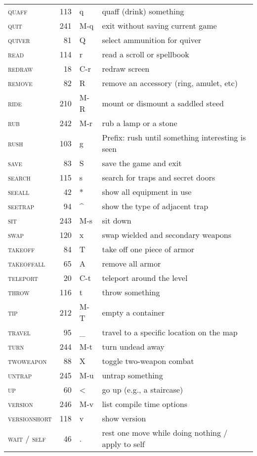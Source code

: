 \documentclass{article}
\begin{document}
\begin{center}
\begin{longtable}{>{\scshape}lr>{\ttfamily}ll}
    quaff & 113 & q  & quaff (drink) something\\
    quit & 241 & M-q  & exit without saving current game\\
    quiver & 81 & Q  & select ammunition for quiver\\
    read & 114 & r  & read a scroll or spellbook\\
    redraw & 18 & C-r  & redraw screen\\
    remove & 82 & R  & remove an accessory (ring, amulet, etc)\\
    ride & 210 & M-R  & mount or dismount a saddled steed\\
    rub & 242 & M-r  & rub a lamp or a stone\\
    rush & 103 & g  & Prefix: rush until something interesting is seen\\
    save & 83 & S  & save the game and exit\\
    search & 115 & s  & search for traps and secret doors\\
    seeall & 42 & *  & show all equipment in use\\
    seetrap & 94 & \textasciicircum  & show the type of adjacent trap\\
    sit & 243 & M-s  & sit down\\
    swap & 120 & x  & swap wielded and secondary weapons\\
    takeoff & 84 & T  & take off one piece of armor\\
    takeoffall & 65 & A  & remove all armor\\
    teleport & 20 & C-t  & teleport around the level\\
    throw & 116 & t  & throw something\\
    tip & 212 & M-T  & empty a container\\
    travel & 95 & \_  & travel to a specific location on the map\\
    turn & 244 & M-t  & turn undead away\\
    twoweapon & 88 & X  & toggle two-weapon combat\\
    untrap & 245 & M-u  & untrap something\\
    up & 60 & \textless & go up (e.g., a staircase) \\
    version & 246 & M-v  & list compile time options\\
    versionshort & 118 & v  & show version\\
    wait / self & 46 & . & rest one move while doing nothing / apply to self \\

\end{longtable}
\end{center}
\end{document}
